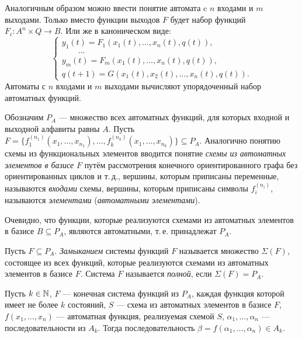 \begin{remark}
    Аналогичным образом можно ввести понятие автомата c $n$ входами и $m$ выходами. Только вместо функции выходов $F$ будет набор функций $F_i:A^n\times Q\to B$. Или же в каноническом виде:
    \[
        \begin{cases}
            y_1(t) = F_1(x_1(t), \ldots, x_n(t), q(t)), \\
             \qquad \ldots\\
            y_m(t) = F_m(x_1(t), \ldots, x_n(t), q(t)), \\
            q(t+1) = G(x_1(t), x_2(t), \ldots, x_n(t), q(t)).
        \end{cases}
    \]
    Автоматы с $n$ входами и $m$ выходами вычисляют упорядоченный набор автоматных функций.
\end{remark}

\begin{definition}
    Обозначим $P_A$ --- множество всех автоматных функций, для которых входной и выходной алфавиты равны $A$. Пусть $F=\{f_1^{(n_1)}(x_1, \ldots, x_{n_1}), \ldots, f_k^{(n_k)}(x_1, \ldots, x_{n_k})\} \subseteq P_A$. Аналогично понятию схемы из функциональных элементов вводится понятие \textit{схемы из автоматных элементов в базисе} $F$ путём рассмотрения конечного ориентированного графа без ориентированных циклов и т.\,д., вершины, которым приписаны переменные, называются \textit{входами} схемы, вершины, которым приписаны символы $f_i^{(n_i)}$, называются \textit{элементами} (\textit{автоматными элементами}).
\end{definition}

Очевидно, что функции, которые реализуются схемами из автоматных элементов в базисе $ B \subseteq P_A$, являются автоматными, т.\,е. принадлежат $P_A$.

\begin{definition}
    Пусть $F\subseteq P_A$. \textit{Замыканием} системы функций $F$ называется множество $\Sigma(F)$, состоящее из всех функций, которые реализуются схемами из автоматных элементов в базисе $F$. Система $F$ называется \textit{полной}, если $\Sigma(F) = P_A$.
\end{definition}

\begin{lemma}
    Пусть $k\in \mathbb{N}$, $F$ --- конечная система функций из $P_A$, каждая функция которой имеет не более $k$ состояний, $S$ --- схема из автоматных элементов в базисе $F$, $f(x_1, \ldots, x_n)$ --- автоматная функция, реализуемая схемой $S$, $\alpha_1, \ldots, \alpha_n$ --- последовательности из $A_k$. Тогда последовательность $\beta = f(\alpha_1, \ldots, \alpha_n) \in A_k$.
\end{lemma}

